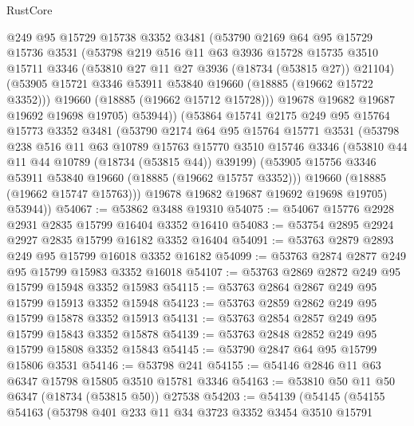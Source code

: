 \begin{lexlean}{RustCore}
\begin{coremodule}
          @249
          @95
          @15729
          @15738
          @3352
          @3481
          (@53790
            @2169
            @64
            @95
            @15729
            @15736
            @3531
            (@53798
              @219
              @516
              @11
              @63
              @3936
              @15728
              @15735
              @3510
              @15711
              @3346
              (@53810 @27 @11 @27 @3936 (@18734 (@53815 @27)) @21104)
              (@53905 @15721 @3346 @53911 @53840 @19660 (@18885 (@19662 @15722 @3352)))
              @19660
              (@18885 (@19662 @15712 @15728)))
            @19678
            @19682
            @19687
            @19692
            @19698
            @19705)
          @53944))
      (@53864
        @15741
        @2175
        @249
        @95
        @15764
        @15773
        @3352
        @3481
        (@53790
          @2174
          @64
          @95
          @15764
          @15771
          @3531
          (@53798
            @238
            @516
            @11
            @63
            @10789
            @15763
            @15770
            @3510
            @15746
            @3346
            (@53810 @44 @11 @44 @10789 (@18734 (@53815 @44)) @39199)
            (@53905 @15756 @3346 @53911 @53840 @19660 (@18885 (@19662 @15757 @3352)))
            @19660
            (@18885 (@19662 @15747 @15763)))
          @19678
          @19682
          @19687
          @19692
          @19698
          @19705)
        @53944))
@54067 := @53862 @3488 @19310
@54075 := @54067 @15776 @2928 @2931 @2835 @15799 @16404 @3352 @16410
@54083 := @53754 @2895 @2924 @2927 @2835 @15799 @16182 @3352 @16404
@54091 := @53763 @2879 @2893 @249 @95 @15799 @16018 @3352 @16182
@54099 := @53763 @2874 @2877 @249 @95 @15799 @15983 @3352 @16018
@54107 := @53763 @2869 @2872 @249 @95 @15799 @15948 @3352 @15983
@54115 := @53763 @2864 @2867 @249 @95 @15799 @15913 @3352 @15948
@54123 := @53763 @2859 @2862 @249 @95 @15799 @15878 @3352 @15913
@54131 := @53763 @2854 @2857 @249 @95 @15799 @15843 @3352 @15878
@54139 := @53763 @2848 @2852 @249 @95 @15799 @15808 @3352 @15843
@54145 := @53790 @2847 @64 @95 @15799 @15806 @3531
@54146 := @53798 @241
@54155 := @54146 @2846 @11 @63 @6347 @15798 @15805 @3510 @15781 @3346
@54163 := @53810 @50 @11 @50 @6347 (@18734 (@53815 @50)) @27538
@54203 := @54139
    (@54145
      (@54155
        @54163
        (@53798
          @401
          @233
          @11
          @34
          @3723
          @3352
          @3454
          @3510
          @15791

\end{coremodule}
\end{lexlean}
